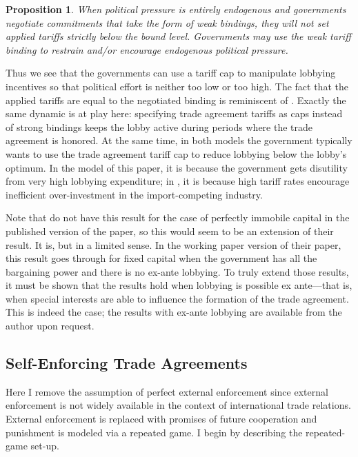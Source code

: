 \documentclass[12pt,titlepage]{article}
\newtheorem{proposition}{Proposition}
\begin{document}
\begin{proposition}
    When political pressure is entirely endogenous and governments negotiate commitments that take the form of weak bindings, they will not set applied tariffs strictly below the bound level. Governments may use the weak tariff binding to restrain and/or encourage endogenous political pressure.
		\label{res:weak}
\end{proposition}

Thus we see that the governments can use a tariff cap to manipulate lobbying incentives so that political effort is neither too low or too high. The fact that the applied tariffs are equal to the negotiated binding is reminiscent of \Textcite{mrc2007}. Exactly the same dynamic is at play here: specifying trade agreement tariffs as caps instead of strong bindings keeps the lobby active during periods where the trade agreement is honored. At the same time, in both models the government typically wants to use the trade agreement tariff cap to reduce lobbying below the lobby's optimum. In the model of this paper, it is because the government gets disutility from very high lobbying expenditure; in \Textcite{mrc2007}, it is because high tariff rates encourage inefficient over-investment in the import-competing industry.

Note that \Textcite{mrc2007} do not have this result for the case of perfectly immobile capital in the published version of the paper, so this would seem to be an extension of their result. It is, but in a limited sense. In the working paper version of their paper, this result goes through for fixed capital when the government has all the bargaining power and there is no ex-ante lobbying. To truly extend those results, it must be shown that the results hold when lobbying is possible ex ante---that is, when special interests
 are able to influence the formation of the trade agreement. This is indeed the case; the results with ex-ante lobbying are available from the author upon request.

					
	
\subsection{Self-Enforcing Trade Agreements}
\label{sec:self}
Here I remove the assumption of perfect external enforcement since external enforcement is not widely available in the context of international trade relations. External enforcement is replaced with promises of future cooperation and punishment is modeled via a repeated game. I begin by describing the repeated-game set-up. 
\end{document}
